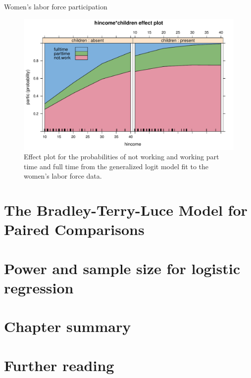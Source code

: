 \documentclass[11pt]{book}
\renewenvironment{knitrout}{\small\renewcommand{\baselinestretch}{.85}}{} %
\begin{document}
\begin{Example}[wlfpart2]{Women's labor force participation}
\begin{knitrout}
\begin{figure}[!htbp]
\centerline{\includegraphics[width=.8\textwidth]{ch07/fig/wlf-multi-effect} }

\caption[Effect plot for the probabilities of not working and working part time and full time from the generalized logit model fit to the women's labor force data]{Effect plot for the probabilities of not working and working part time and full time from the generalized logit model fit to the women's labor force data.\label{fig:wlf-multi-effect}}
\end{figure}


\end{knitrout}

\end{Example}

\section{The Bradley-Terry-Luce Model for Paired Comparisons}\label{sec:logist-btl}

\section{Power and sample size for logistic regression} \label{sec:logistic-power}

\section{Chapter summary}\label{sec:ch07-summary}



\section{Further reading}\label{sec:ch07-reading}
\end{document}
